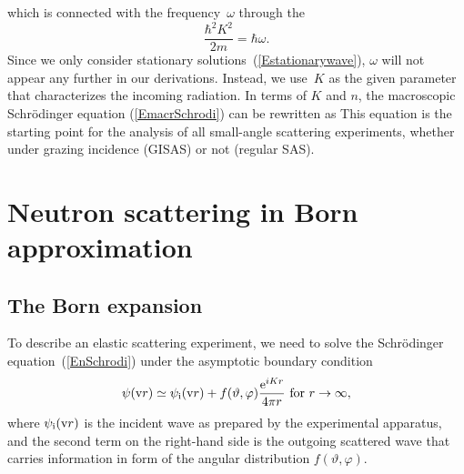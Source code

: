 which is connected with the frequency~$\omega$ through the
\begin{equation}
  \frac{\hbar^2 K^2}{2m} = \hbar\omega.
\end{equation}
Since we only consider stationary solutions~(\ref{Estationarywave}),
$\omega$ will not appear any further in our derivations.
Instead, we use~$K$ as the given parameter that characterizes the
incoming radiation.
In terms of $K$ and $n$,
the macroscopic Schrödinger equation (\ref{EmacrSchrodi})
can be rewritten as
This equation is the starting point for the analysis of all
small-angle scattering experiments,
whether under grazing incidence (GISAS) or not (regular SAS).
%
%

%
%

\section{Neutron scattering in Born approximation}

\subsection{The Born expansion}\label{SBorn}

%

To describe an elastic scattering experiment,
we need to solve the Schrödinger equation~(\ref{EnSchrodi})
under the asymptotic boundary condition
\begin{equation}\label{Escabouco}
  \psi(\text{v}{r})
  \simeq \psi_{\text{i}}(\text{v}{r}) + f(\vartheta,\varphi)\frac{\text{e}^{iKr}}{4\pi r}
  \text{~for~}r\to\infty,
\end{equation}
%
%
where $\psi_{\text{i}}(\text{v}{r})$ is the incident wave
as prepared by the experimental apparatus,
and the second term on the right-hand side is
the outgoing scattered wave
that carries information in form of the angular distribution
$f(\vartheta,\varphi)$.

